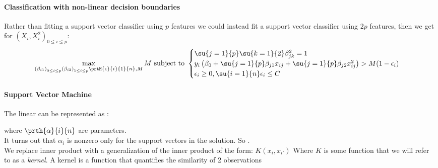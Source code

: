 \paragraph{Classification with non-linear decision boundaries}
Rather than fitting a support vector classifier using $p$ features
we could instead fit a support vector classifier using $2p$ features,
then we get for $\left(X_{i},X_{i}^{2}\right)_{0\leq i\leq p}$:
$$
\max\limits_{\left(\beta_{i1}\right)_{0\leq i\leq p}\left(\beta_{i2}\right)_{1\leq i\leq p}\prtH{\epsilon}{i}{1}{n},M} M\\
\text{ subject to }
\begin{cases}
	\su{{j=1}}{p}\su{{k=1}}{2}\beta_{jk}^{2}=1\\
	y_{i}\left( \beta_{0}+\su{{j=1}}{p}\beta_{j1}x_{ij}+\su{{j=1}}{p}\beta_{j2}x_{ij}^{2}\right) >
	M(1-\epsilon_{i})\\
	\epsilon_{i}\geq 0, \su{{i=1}}{n}\epsilon_{i}\leq C
\end{cases}
$$

\paragraph{Support Vector Machine}
The linear  can be represented as :
\begin{center}
\end{center}
where $\prth{\alpha}{i}{n}$ are parameters.\\
It turns out that $\alpha_{i}$ is nonzero only for the support vectors
in the solution. So .\\

We replace inner product with a generalization of the inner product
of the form:
$K(x_{i},x_{i'})$
Where $K$ is some function that we will refer to as a \emph{kernel}.
A kernel is a function that quantifies the similarity of 2 observations

